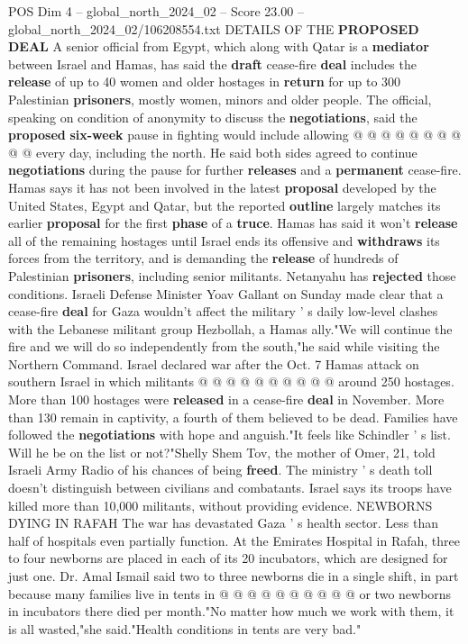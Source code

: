 \begin{textsample}{POS Dim 4 – global\_north\_2024\_02 – Score 23.00 – global\_north\_2024\_02/106208554.txt}
DETAILS OF THE \textbf{PROPOSED} \textbf{DEAL} A senior official from Egypt, which along with Qatar is a \textbf{mediator} between Israel and Hamas, has said the \textbf{draft} cease-fire \textbf{deal} includes the \textbf{release} of up to 40 women and older hostages in \textbf{return} for up to 300 Palestinian \textbf{prisoners}, mostly women, minors and older people.
The official, speaking on condition of anonymity to discuss the \textbf{negotiations}, said the \textbf{proposed} \textbf{six-week} pause in fighting would include allowing @ @ @ @ @ @ @ @ @ @ every day, including the north.
He said both sides agreed to continue \textbf{negotiations} during the pause for further \textbf{releases} and a \textbf{permanent} cease-fire.
Hamas says it has not been involved in the latest \textbf{proposal} developed by the United States, Egypt and Qatar, but the reported \textbf{outline} largely matches its earlier \textbf{proposal} for the first \textbf{phase} of a \textbf{truce}.
Hamas has said it won't \textbf{release} all of the remaining hostages until Israel ends its offensive and \textbf{withdraws} its forces from the territory, and is demanding the \textbf{release} of hundreds of Palestinian \textbf{prisoners}, including senior militants.
Netanyahu has \textbf{rejected} those conditions.
Israeli Defense Minister Yoav Gallant on Sunday made clear that a cease-fire \textbf{deal} for Gaza wouldn't affect the military ' s daily low-level clashes with the Lebanese militant group Hezbollah, a Hamas ally."We will continue the fire and we will do so independently from the south,"he said while visiting the Northern Command.
Israel declared war after the Oct. 7 Hamas attack on southern Israel in which militants @ @ @ @ @ @ @ @ @ @ around 250 hostages.
More than 100 hostages were \textbf{released} in a cease-fire \textbf{deal} in November.
More than 130 remain in captivity, a fourth of them believed to be dead.
Families have followed the \textbf{negotiations} with hope and anguish."It feels like Schindler ' s list.
Will he be on the list or not?"Shelly Shem Tov, the mother of Omer, 21, told Israeli Army Radio of his chances of being \textbf{freed}.
The ministry ' s death toll doesn't distinguish between civilians and combatants.
Israel says its troops have killed more than 10,000 militants, without providing evidence.
NEWBORNS DYING IN RAFAH The war has devastated Gaza ' s health sector.
Less than half of hospitals even partially function.
At the Emirates Hospital in Rafah, three to four newborns are placed in each of its 20 incubators, which are designed for just one.
Dr.
Amal Ismail said two to three newborns die in a single shift, in part because many families live in tents in @ @ @ @ @ @ @ @ @ @ or two newborns in incubators there died per month."No matter how much we work with them, it is all wasted,"she said."Health conditions in tents are very bad."

\end{textsample}
